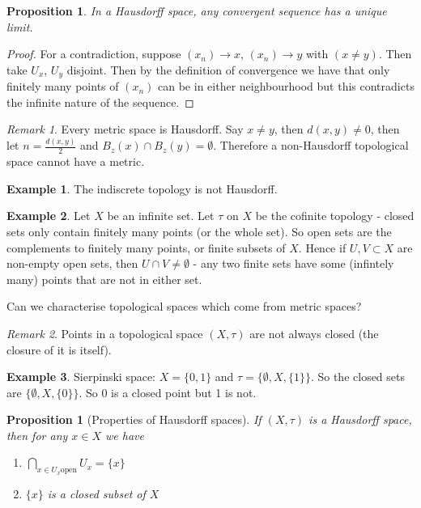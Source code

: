 \documentclass{article}
\theoremstyle{definition}
\newtheorem{exmp}{Example}[section]
\theoremstyle{plain}%
\newtheorem{prop}[thm]{Proposition}
\theoremstyle{remark}
\newtheorem*{rem}{Remark}
\newcommand{\Intersection}{\bigcap}
\begin{document}
\begin{prop}
    In a Hausdorff space, any convergent sequence has a unique limit.
\end{prop}

\begin{proof}
    For a contradiction, suppose $(x_n) \to x$, $(x_n) \to y$ with $(x \ne y)$. Then take $U_x$, $U_y$ disjoint. Then by the definition of convergence we have that only finitely many points of $(x_n)$ can be in either neighbourhood but this contradicts the infinite nature of the sequence.
\end{proof}

\begin{rem}
    Every metric space is Hausdorff. Say $x \ne y$, then $d(x,y) \ne 0$, then let $n = \frac{d(x,y)}{2}$ and $B_z(x) \cap B_z(y) = \emptyset$. Therefore a non-Hausdorff topological space cannot have a metric.
\end{rem}

\begin{exmp}
    The indiscrete topology is not Hausdorff.
\end{exmp}

\begin{exmp}
    Let $X$ be an infinite set. Let $\tau$ on $X$ be the cofinite topology - closed sets only contain finitely many points (or the whole set). So open sets are the complements to finitely many points, or finite subsets of $X$. Hence if $U,V \subset X$ are non-empty open sets, then $U \cap V \ne \emptyset$ - any two finite sets have some (infintely many) points that are not in either set.
\end{exmp}

Can we characterise topological spaces which come from metric spaces?

\begin{rem}
    Points in a topological space $(X, \tau)$ are not always closed (the closure of it is itself).
\end{rem}

\begin{exmp}
    Sierpinski space: $X = \{0,1\}$ and $\tau = \{\emptyset, X, \{1\}\}$. So the closed sets are $\{\emptyset, X, \{0\}\}$. So 0 is a closed point but 1 is not.
\end{exmp}

\begin{prop}[Properties of Hausdorff spaces]
    If $(X, \tau)$ is a Hausdorff space, then for any $x \in X$ we have
    \begin{enumerate}
        \item $\Intersection_{x \in U_x \text{open}} U_x = \{x\}$
        \item $\{x\}$ is a closed subset of $X$
    \end{enumerate}
\end{prop}
\end{document}
